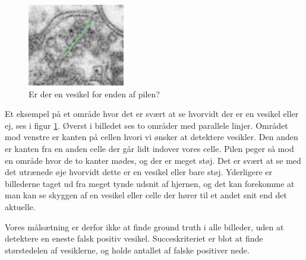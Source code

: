 \begin{figure}[H]
	\centering
	\includegraphics[scale=1.5]{files/intro/img/celle_questionves.png}
	\caption{Er der en vesikel for enden af pilen?\label{fig:intro_celle_question}}
\end{figure}

Et eksempel på et område hvor det er svært at se hvorvidt der er en vesikel eller ej, ses i figur \ref{fig:intro_celle_question}. Øverst i billedet ses to områder med parallele linjer. Området mod venstre er kanten på cellen hvori vi ønsker at detektere vesikler. Den anden er kanten fra en anden celle der går lidt indover vores celle. Pilen peger så mod en område hvor de to kanter mødes, og der er meget støj. Det er svært at se med det utrænede øje hvorvidt dette er en vesikel eller bare støj. Yderligere er billederne taget ud fra meget tynde udsnit af hjernen, og det kan forekomme at man kan se skyggen af en vesikel eller celle der hører til et andet snit end det aktuelle.  

Vores målsætning er derfor ikke at finde ground truth i alle billeder, uden at detektere en eneste falsk positiv vesikel. Succeskriteriet er blot at finde størstedelen af vesiklerne, og holde antallet af falske positiver nede.   



